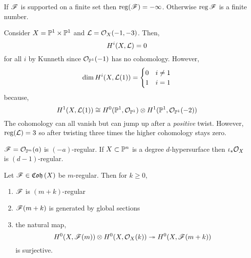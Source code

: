 \documentclass[12pt]{article}
\DeclareMathOperator{\reg}{\mathrm{reg}}
\begin{document}
\begin{rmk}
If $\F$ is supported on a finite set then $\reg(\F) = - \infty$. Otherwise $\reg{\F}$ is a finite number.
\end{rmk}


\begin{example}
Consider $X = \P^1 \times \P^1$ and $\L = \struct{X}(-1,-3)$. Then,
\[ H^i(X, \L) = 0 \]
for all $i$ by Kunneth since $\struct{\P^1}(-1)$ has no cohomology. However,
\[ \dim H^i(X, \L(1)) = 
\begin{cases}
0 & i \neq 1
\\
1 & i = 1
\end{cases} \]
because,
\[ H^1(X, \L(1)) \cong H^0(\P^1, \struct{\P^1}) \ot H^1(\P^1, \struct{\P^1}(-2)) \]
The cohomology can all vanish but can jump up after a \textit{positive} twist. However, $\reg(\L) = 3$ so after twisting three times the higher cohomology stays zero. 
\end{example}

\begin{example}
$\F = \struct{\P^n}(a)$ is $(-a)$-regular. If $X \subset \P^n$ is a degree $d$-hypersurface then $\iota_* \struct{X}$ is $(d-1)$-regular. 
\end{example}

\begin{prop}
Let $\F \in \Coh{X}$ be $m$-regular. Then for $k \ge 0$,
\begin{enumerate}
\item $\F$ is $(m+k)$-regular
\item $\F(m + k)$ is generated by global sections
\item the natural map,
\[ H^0(X, \F(m)) \ot H^0(X, \struct{X}(k)) \onto H^0(X, \F(m+k)) \]
is surjective.
\end{enumerate}
\end{prop}
\end{document}
